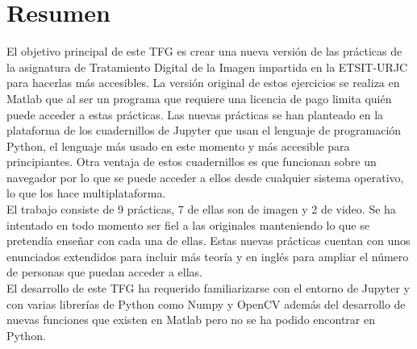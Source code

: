 \chapter*{Resumen}

El objetivo principal de este TFG es crear una nueva versión de las prácticas de la asignatura de Tratamiento Digital de la Imagen impartida en la ETSIT-URJC para hacerlas más accesibles. La versión original de estos ejercicios se realiza en Matlab que al ser un programa que requiere una licencia de pago limita quién puede acceder a estas prácticas. Las nuevas prácticas se han planteado en la plataforma de los cuadernillos de Jupyter que usan el lenguaje de programación Python, el lenguaje más usado en este momento y más accesible para principiantes. Otra ventaja de estos cuadernillos es que funcionan sobre un navegador por lo que se puede acceder a ellos desde cualquier sistema operativo, lo que los hace multiplataforma.\\

El trabajo consiste de 9 prácticas, 7 de ellas son de imagen y 2 de video. Se ha intentado en todo momento ser fiel a las originales manteniendo lo que se pretendía enseñar con cada una de ellas. Estas nuevas prácticas cuentan con unos enunciados extendidos para incluir más teoría y en inglés para ampliar el número de personas que puedan acceder a ellas.\\

El desarrollo de este TFG ha requerido familiarizarse con el entorno de Jupyter y con varias librerías de Python como Numpy y OpenCV además del desarrollo de nuevas funciones que existen en Matlab pero no se ha podido encontrar en Python.\\


